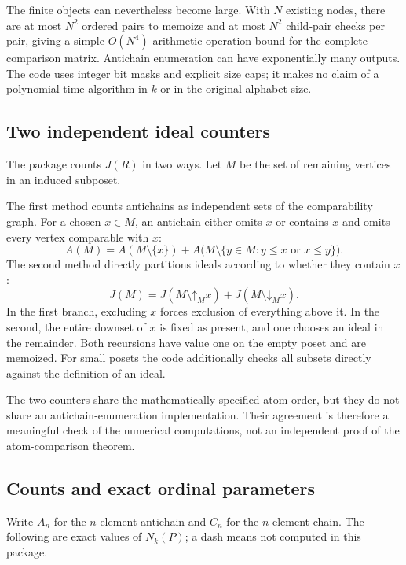 \documentclass[11pt,a4paper]{article}
\numberwithin{equation}{section}
\theoremstyle{definition}
\theoremstyle{remark}
\newcommand{\down}{\mathord{\downarrow}}
\newcommand{\up}{\mathord{\uparrow}}
\begin{document}
The finite objects can nevertheless become large. With $N$ existing
nodes, there are at most $N^2$ ordered pairs to memoize and at most $N^2$
child-pair checks per pair, giving a simple $O(N^4)$ arithmetic-operation
bound for the complete comparison matrix. Antichain enumeration can have
exponentially many outputs. The code uses integer bit masks and explicit
size caps; it makes no claim of a polynomial-time algorithm in $k$ or
in the original alphabet size.

\subsection{Two independent ideal counters}

The package counts $J(R)$ in two ways. Let $M$ be the set of remaining
vertices in an induced subposet.

The first method counts antichains as independent sets of the
comparability graph. For a chosen $x\in M$, an antichain either omits
$x$ or contains $x$ and omits every vertex comparable with $x$:
\begin{equation}\label{height:eq:antichaincount}
 A(M)=A(M\setminus\{x\})+
 A\bigl(M\setminus\{y\in M:y\le x\text{ or }x\le y\}\bigr).
\end{equation}
The second method directly partitions ideals according to whether they
contain $x$:
\begin{equation}\label{height:eq:idealcount}
 J(M)=J(M\setminus\up_M x)+J(M\setminus\down_M x).
\end{equation}
In the first branch, excluding $x$ forces exclusion of everything above
it. In the second, the entire downset of $x$ is fixed as present, and
one chooses an ideal in the remainder. Both recursions have value one
on the empty poset and are memoized. For small posets the code additionally
checks all subsets directly against the definition of an ideal.

The two counters share the mathematically specified atom order, but they
do not share an antichain-enumeration implementation. Their agreement is
therefore a meaningful check of the numerical computations, not an
independent proof of the atom-comparison theorem.

\subsection{Counts and exact ordinal parameters}

Write $A_n$ for the $n$-element antichain and $C_n$ for the $n$-element chain.
The following are exact values of $N_k(P)$; a dash means not computed in
this package.
\end{document}
